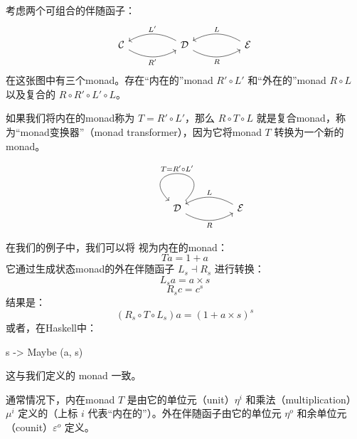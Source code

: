 \documentclass[DaoFP]{subfiles}
\begin{document}
    考虑两个可组合的伴随函子：
    \[
        \begin{tikzcd}
            \mathcal{C}
            \arrow[rr, bend right, "R'"']
            &&
            \mathcal{D}
            \arrow[ll, bend right, "L'"']
            \arrow[rr, bend right, "R"']
            &&
            \mathcal{E}
            \arrow[ll, bend right, "L"']
        \end{tikzcd}
    \]
    在这张图中有三个monad。存在“内在的”monad $R' \circ L'$ 和“外在的”monad $R \circ L$ 以及复合的 $R \circ R' \circ L' \circ L$。

    如果我们将内在的monad称为 $T = R' \circ L'$，那么 $R \circ T \circ L$ 就是复合monad，称为“monad变换器”（monad transformer），因为它将monad $T$ 转换为一个新的monad。

    \[
        \begin{tikzcd}
            &&
            \mathcal{D}
            \arrow[loop, "T = R' \circ L'"']
            \arrow[rr, bend right, "R"']
            &&
            \mathcal{E}
            \arrow[ll, bend right, "L"']
        \end{tikzcd}
    \]

    在我们的例子中，我们可以将  视为内在的monad：
    \[ T a = 1 + a \]
    它通过生成状态monad的外在伴随函子 $L_s \dashv R_s$ 进行转换：
    \[ L_s a = a \times s \]
    \[ R_s c = c^s \]
    结果是：
    \[ (R_s \circ T \circ L_s) a = (1 + a \times s)^s\]
    或者，在Haskell中：
    \begin{haskell}
        s -> Maybe (a, s)
    \end{haskell}
    这与我们定义的  monad 一致。

    通常情况下，内在monad $T$ 是由它的单位元（unit）$\eta^i$ 和乘法（multiplication）$\mu^i$ 定义的（上标 $i$ 代表“内在的”）。外在伴随函子由它的单位元 $\eta^o$ 和余单位元（counit）$\varepsilon^o$ 定义。
\end{document}
